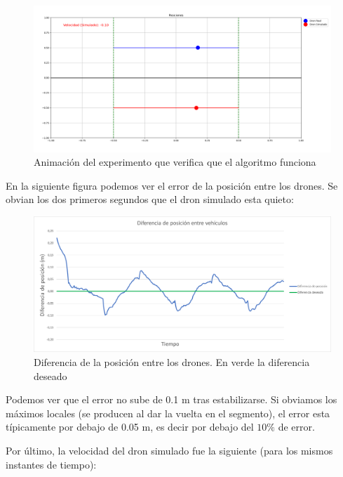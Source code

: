 \begin{figure}[h]
    \centering
    \includegraphics[width=\textwidth]{img/fig/fig4.8-coordinated-experiment.png}
    \caption{Animación del experimento que verifica que el algoritmo funciona}
    \label{fig:coordination-experiment}
\end{figure}

En la siguiente figura podemos ver el error de la posición entre los drones. 
Se obvian los dos primeros segundos que el dron simulado esta quieto:

\begin{figure}[h]
    \centering
    \includegraphics[width=\textwidth]{img/fig/fig4.9-experiment-pos-error.png}
    \caption{Diferencia de la posición entre los drones. 
    En \textcolor{Green3}{verde} la diferencia deseado}
    \label{fig:pos-error-experiment}
\end{figure}

Podemos ver que el error no sube de 0.1 m tras estabilizarse.
Si obviamos los máximos locales (se producen al dar la vuelta en el segmento), el error esta típicamente por debajo de 0.05 m, es decir por debajo del $10\%$ de error.

Por último, la velocidad del dron simulado fue la siguiente (para los mismos instantes de tiempo):

